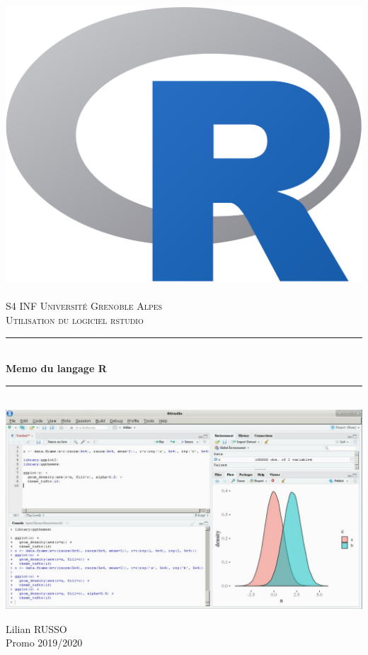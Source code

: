\documentclass{article}
\newcommand{\HRule}{\rule{\linewidth}{0.5mm}}
\begin{document}
\begin{titlepage}
  \begin{sffamily}
  \begin{center}

    \includegraphics[scale=0.04]{R_logo.png}~\\[1.5cm]

    \textsc{\LARGE S4 INF Université Grenoble Alpes}\\[2cm]
    
    \textsc{\large Utilisation du logiciel rstudio}

    \HRule \\[0.4cm]
    { \huge \bfseries Memo du langage R\\[0.4cm] }

    \HRule \\[2cm]
    \includegraphics[scale=0.28]{rstudio_ide.png}
    \\[4cm]

    \begin{minipage}{0.4\textwidth}
      \begin{center} \large
        Lilian \textsc{RUSSO}\\
        Promo 2019/2020\\
      \end{center}
    \end{minipage}

  \end{center}
  \end{sffamily}
\end{titlepage}
\end{document}
